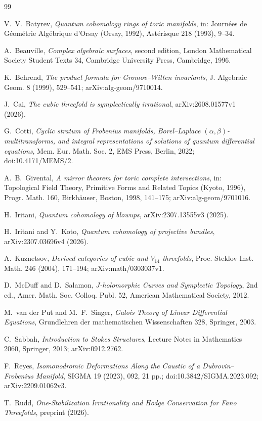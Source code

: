 \documentclass[11pt]{article}
\numberwithin{equation}{section}
\theoremstyle{definition}
\theoremstyle{remark}
\begin{document}
\begin{thebibliography}{99}

V.~V.~Batyrev,
\emph{Quantum cohomology rings of toric manifolds},
in: Journ\'ees de G\'eom\'etrie Alg\'ebrique d'Orsay (Orsay, 1992),
Ast\'erisque 218 (1993), 9--34.

A.~Beauville,
\emph{Complex algebraic surfaces}, second edition,
London Mathematical Society Student Texts 34,
Cambridge University Press, Cambridge, 1996.

K.~Behrend,
\emph{The product formula for Gromov--Witten invariants},
J. Algebraic Geom. 8 (1999), 529--541; arXiv:alg-geom/9710014.

J.~Cai,
\emph{The cubic threefold is symplectically irrational},
arXiv:2608.01577v1 (2026).

G.~Cotti,
\emph{Cyclic stratum of Frobenius manifolds, Borel--Laplace
\((\alpha,\beta)\)-multitransforms, and integral representations of
solutions of quantum differential equations},
Mem. Eur. Math. Soc. 2, EMS Press, Berlin, 2022;
doi:10.4171/MEMS/2.

A.~B.~Givental,
\emph{A mirror theorem for toric complete intersections},
in: Topological Field Theory, Primitive Forms and Related Topics (Kyoto, 1996),
Progr. Math. 160, Birkh\"auser, Boston, 1998, 141--175;
arXiv:alg-geom/9701016.

H.~Iritani,
\emph{Quantum cohomology of blowups},
arXiv:2307.13555v3 (2025).

H.~Iritani and Y.~Koto,
\emph{Quantum cohomology of projective bundles},
arXiv:2307.03696v4 (2026).

A.~Kuznetsov,
\emph{Derived categories of cubic and \(V_{14}\) threefolds},
Proc. Steklov Inst. Math. 246 (2004), 171--194;
arXiv:math/0303037v1.

D.~McDuff and D.~Salamon,
\emph{\(J\)-holomorphic Curves and Symplectic Topology}, 2nd ed.,
Amer. Math. Soc. Colloq. Publ. 52, American Mathematical Society, 2012.

M.~van der Put and M.~F.~Singer,
\emph{Galois Theory of Linear Differential Equations},
Grundlehren der mathematischen Wissenschaften 328, Springer, 2003.

C.~Sabbah,
\emph{Introduction to Stokes Structures},
Lecture Notes in Mathematics 2060, Springer, 2013;
arXiv:0912.2762.

F.~Reyes,
\emph{Isomonodromic Deformations Along the Caustic of a Dubrovin--Frobenius Manifold},
SIGMA 19 (2023), 092, 21 pp.; doi:10.3842/SIGMA.2023.092;
arXiv:2209.01062v3.

T.~Rudd,
\emph{One-Stabilization Irrationality and Hodge Conservation for Fano Threefolds},
preprint (2026).

\end{thebibliography}
\end{document}
